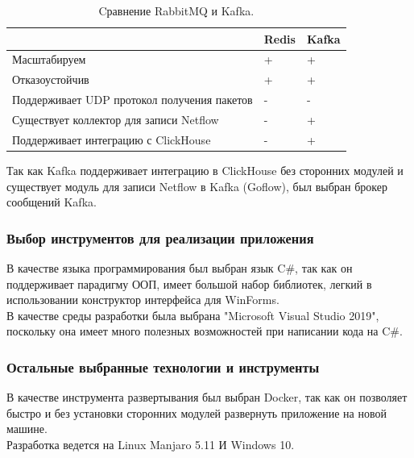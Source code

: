 \begin{table}[H]
\caption{Cравнение RabbitMQ и Kafka.}
\begin{center}
\begin{tabular}{ |p{5cm} |p{5cm}|p{5cm} |}
\hline 
 & Redis & Kafka\\ \hline 
Масштабируем & + & + \\ \hline 
Отказоустойчив & + & + \\ \hline 
Поддерживает UDP протокол получения пакетов & - & -  \\ \hline 
Существует коллектор для записи Netflow & - & +  \\ \hline 
Поддерживает интеграцию с ClickHouse & - & + \\ \hline 
\end{tabular}
\end{center}
\label{CompareREDKAF}
\end{table}


\indent Так как Kafka поддерживает интеграцию в ClickHouse без сторонних модулей и существует модуль для записи Netflow в Kafka (Goflow)\cite{Goflow}, был выбран брокер сообщений Kafka.

\subsubsection{Выбор инструментов для реализации приложения}

В качестве языка программирования был выбран язык C\#, так как он поддерживает парадигму ООП, имеет большой набор библиотек, легкий в использовании конструктор интерфейса для WinForms\cite{sharp}. \\
\indent В качестве среды разработки была выбрана "Microsoft Visual Studio 2019"\cite{vs}, поскольку она имеет много полезных возможностей при написании кода на C\#\cite{vs}. 

\subsubsection{Остальные выбранные технологии и инструменты}
\indent В качестве инструмента развертывания был выбран Docker, так как он позволяет быстро и без установки сторонних модулей развернуть приложение на новой машине. \\
\indent Разработка ведется на Linux Manjaro 5.11 И Windows 10.

